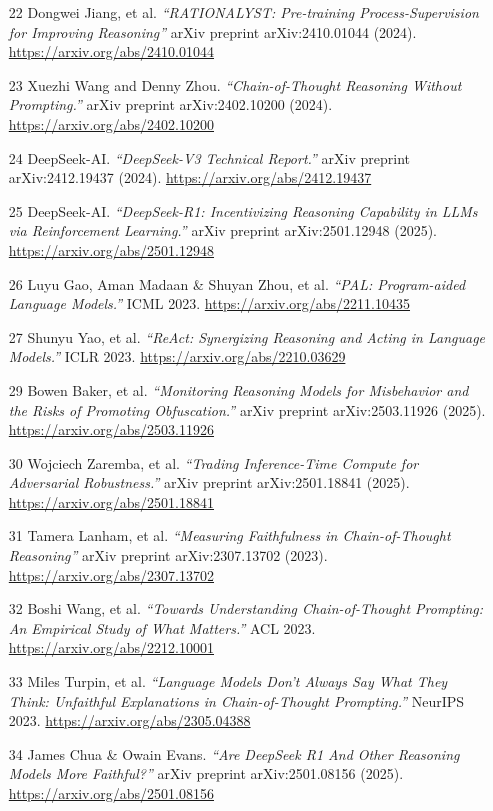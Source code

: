 \documentclass[12pt]{article}
\begin{document}
\begin{itemize}
    \item [22] Dongwei Jiang, et al. \textit{``RATIONALYST: Pre-training Process-Supervision for Improving Reasoning''} arXiv preprint arXiv:2410.01044 (2024). \url{https://arxiv.org/abs/2410.01044}
    \item [23] Xuezhi Wang and Denny Zhou. \textit{``Chain-of-Thought Reasoning Without Prompting.''} arXiv preprint arXiv:2402.10200 (2024). \url{https://arxiv.org/abs/2402.10200}
    \item [24] DeepSeek-AI. \textit{``DeepSeek-V3 Technical Report.''} arXiv preprint arXiv:2412.19437 (2024). \url{https://arxiv.org/abs/2412.19437}
    \item [25] DeepSeek-AI. \textit{``DeepSeek-R1: Incentivizing Reasoning Capability in LLMs via Reinforcement Learning.''} arXiv preprint arXiv:2501.12948 (2025). \url{https://arxiv.org/abs/2501.12948}
    \item [26] Luyu Gao, Aman Madaan \& Shuyan Zhou, et al. \textit{``PAL: Program-aided Language Models.''} ICML 2023. \url{https://arxiv.org/abs/2211.10435}
    \item [27] Shunyu Yao, et al. \textit{``ReAct: Synergizing Reasoning and Acting in Language Models.''} ICLR 2023. \url{https://arxiv.org/abs/2210.03629}
    \item [29] Bowen Baker, et al. \textit{``Monitoring Reasoning Models for Misbehavior and the Risks of Promoting Obfuscation.''} arXiv preprint arXiv:2503.11926 (2025). \url{https://arxiv.org/abs/2503.11926}
    \item [30] Wojciech Zaremba, et al. \textit{``Trading Inference-Time Compute for Adversarial Robustness.''} arXiv preprint arXiv:2501.18841 (2025). \url{https://arxiv.org/abs/2501.18841}
    \item [31] Tamera Lanham, et al. \textit{``Measuring Faithfulness in Chain-of-Thought Reasoning''} arXiv preprint arXiv:2307.13702 (2023). \url{https://arxiv.org/abs/2307.13702}
    \item [32] Boshi Wang, et al. \textit{``Towards Understanding Chain-of-Thought Prompting: An Empirical Study of What Matters.''} ACL 2023. \url{https://arxiv.org/abs/2212.10001}
    \item [33] Miles Turpin, et al. \textit{``Language Models Don’t Always Say What They Think: Unfaithful Explanations in Chain-of-Thought Prompting.''} NeurIPS 2023. \url{https://arxiv.org/abs/2305.04388}
    \item [34] James Chua \& Owain Evans. \textit{``Are DeepSeek R1 And Other Reasoning Models More Faithful?''} arXiv preprint arXiv:2501.08156 (2025). \url{https://arxiv.org/abs/2501.08156}

\end{itemize}
\end{document}

